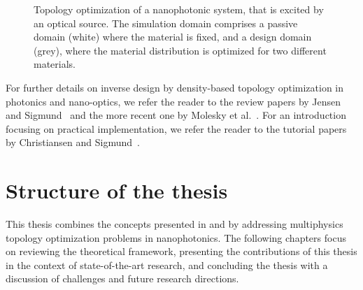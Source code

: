 \begin{figure}[tb]
    \centering
    \caption{Topology optimization of a nanophotonic system, that is excited by an optical source. The simulation domain comprises a passive domain (white) where the material is fixed, and a design domain (grey), where the material distribution is optimized for two different materials.}
        \label{fig:top_opt}
\end{figure}

For further details on inverse design by density-based topology optimization in photonics and nano-optics, we refer the reader to
the review papers by Jensen and Sigmund~\cite{jensen_review} and the more recent one by Molesky et al.~\cite{Molesky_2018}. 
For an introduction focusing on practical implementation, we refer the reader to the tutorial papers by Christiansen and Sigmund~\cite{tutorial_matlab, tutorial_COMSOL}.

\section{Structure of the thesis}

This thesis combines the concepts presented in  and  by addressing multiphysics topology optimization problems in nanophotonics. The following chapters focus on reviewing
 the theoretical framework, presenting the contributions of this thesis in the context of state-of-the-art research,
  and concluding the thesis with a discussion of challenges and future research directions.

